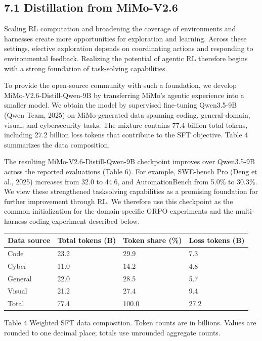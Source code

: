 \documentclass[
  10
]{article}
\newcounter{none} %
\begin{document}
\subsection{7.1 Distillation from
MiMo-V2.6}\label{distillation-from-mimo-v2.6}

Scaling RL computation and broadening the coverage of environments and
harnesses create more opportunities for exploration and learning. Across
these settings, efective exploration depends on coordinating actions and
responding to environmental feedback. Realizing the potential of agentic
RL therefore begins with a strong foundation of task-solving
capabilities.

To provide the open-source community with such a foundation, we develop
MiMo-V2.6-Distill-Qwen-9B by transferring MiMo's agentic experience into
a smaller model. We obtain the model by supervised fine-tuning
Qwen3.5-9B (Qwen Team, 2025) on MiMo-generated data spanning coding,
general-domain, visual, and cybersecurity tasks. The mixture contains
77.4 billion total tokens, including 27.2 billion loss tokens that
contribute to the SFT objective. Table 4 summarizes the data
composition.

The resulting MiMo-V2.6-Distill-Qwen-9B checkpoint improves over
Qwen3.5-9B across the reported evaluations (Table 6). For example,
SWE-bench Pro (Deng et al., 2025) increases from 32.0 to 44.6, and
AutomationBench from 5.0\% to 30.3\%. We view these strengthened
tasksolving capabilities as a promising foundation for further
improvement through RL. We therefore use this checkpoint as the common
initialization for the domain-specific GRPO experiments and the
multi-harness coding experiment described below.

{\def\LTcaptype{none} %
\begin{longtable}[]{@{}|l|l|l|l|@{}}
\toprule\noalign{}
\endhead
\bottomrule\noalign{}
\endlastfoot
\hline
Data source & Total tokens (B) & Token share (\%) & Loss tokens (B) \\
\hline
Code & 23.2 & 29.9 & 7.3 \\
\hline
Cyber & 11.0 & 14.2 & 4.8 \\
\hline
General & 22.0 & 28.5 & 5.7 \\
\hline
Visual & 21.2 & 27.4 & 9.4 \\
\hline
Total & 77.4 & 100.0 & 27.2 \\
\hline
\end{longtable}
}

Table 4 Weighted SFT data composition. Token counts are in billions.
Values are rounded to one decimal place; totals use unrounded aggregate
counts.
\end{document}
